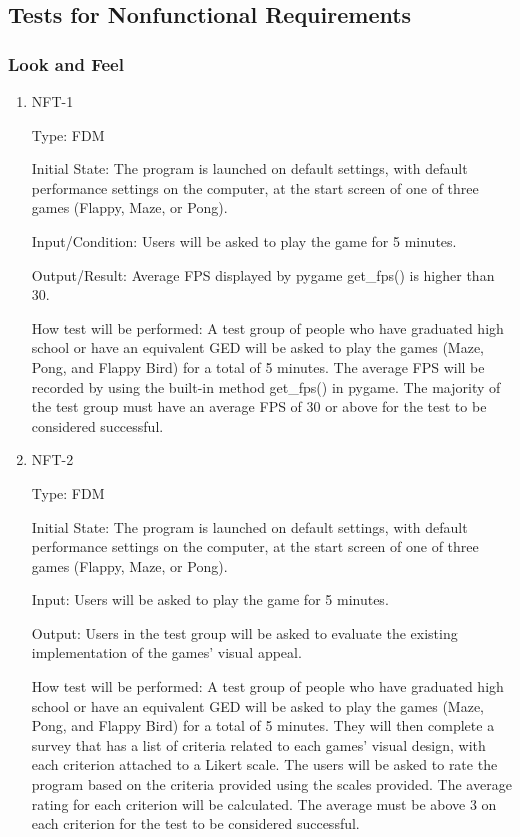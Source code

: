 \documentclass[12pt, titlepage]{article}
\begin{document}
\subsection{Tests for Nonfunctional Requirements}

\subsubsection{Look and Feel}
	
\begin{enumerate}

\item{NFT-1\\}

Type: FDM
					
Initial State: The program is launched on default settings, with default performance settings on the computer, at the start screen of one of three games (Flappy, Maze, or Pong).
					
Input/Condition: Users will be asked to play the game for 5 minutes.
					
Output/Result: Average FPS displayed by pygame get\_fps() is higher than 30.
					
How test will be performed: A test group of people who have graduated high school or have an equivalent GED will be asked to play the games (Maze, Pong, and Flappy Bird) for a total of 5 minutes. The average FPS will be recorded by using the built-in method get\_fps() in pygame. The majority of the test group must have an average FPS of 30 or above for the test to be considered successful.
					
\item{NFT-2\\}

Type: FDM
					
Initial State: The program is launched on default settings, with default performance settings on the computer, at the start screen of one of three games (Flappy, Maze, or Pong).
					
Input: Users will be asked to play the game for 5 minutes.
					
Output: Users in the test group will be asked to evaluate the existing implementation of the games' visual appeal.
					
How test will be performed: A test group of people who have graduated high school or have an equivalent GED will be asked to play the games (Maze, Pong, and Flappy Bird) for a total of 5 minutes. They will then complete a survey that has a list of criteria related to each games' visual design, with each criterion attached to a Likert scale. The users will be asked to rate the program based on the criteria provided using the scales provided.  The average rating for each criterion will be calculated. The average must be above 3 on each criterion for the test to be considered successful. 

					

\end{enumerate}
\end{document}

